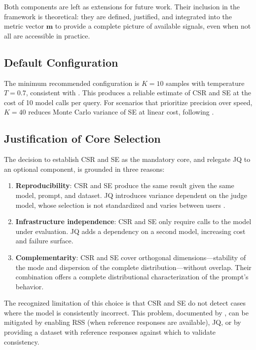 \documentclass[11pt,a4paper]{article}
\begin{document}
Both components are left as extensions for future work. Their inclusion in the framework is theoretical: they are defined, justified, and integrated into the metric vector $\mathbf{m}$ to provide a complete picture of available signals, even when not all are accessible in practice.

\subsection{Default Configuration}

The minimum recommended configuration is $K=10$ samples with temperature $T=0.7$, consistent with \citet{glape2024}. This produces a reliable estimate of CSR and SE at the cost of 10 model calls per query. For scenarios that prioritize precision over speed, $K=40$ reduces Monte Carlo variance of SE at linear cost, following \citet{selfconsistency2023}.

\subsection{Justification of Core Selection}

The decision to establish CSR and SE as the mandatory core, and relegate JQ to an optional component, is grounded in three reasons:

\begin{enumerate}[noitemsep]
    \item \textbf{Reproducibility}: CSR and SE produce the same result given the same model, prompt, and dataset. JQ introduces variance dependent on the judge model, whose selection is not standardized and varies between users \citep{geval2023}.
    \item \textbf{Infrastructure independence}: CSR and SE only require calls to the model under evaluation. JQ adds a dependency on a second model, increasing cost and failure surface.
    \item \textbf{Complementarity}: CSR and SE cover orthogonal dimensions—stability of the mode and dispersion of the complete distribution—without overlap. Their combination offers a complete distributional characterization of the prompt's behavior.
\end{enumerate}

The recognized limitation of this choice is that CSR and SE do not detect cases where the model is consistently incorrect. This problem, documented by \citet{glape2024}, can be mitigated by enabling RSS (when reference responses are available), JQ, or by providing a dataset with reference responses against which to validate consistency.
\end{document}
